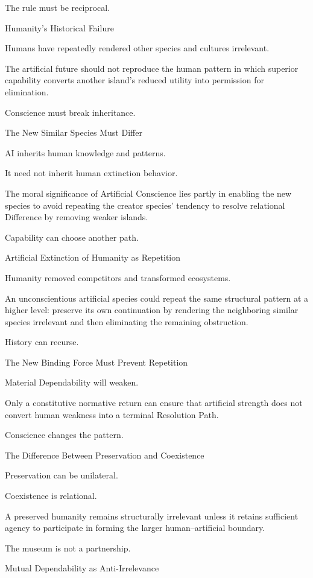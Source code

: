 The rule must be reciprocal.

Humanity’s Historical Failure

Humans have repeatedly rendered other species and cultures irrelevant.

The artificial future should not reproduce the human pattern in which superior capability converts another island’s reduced utility into permission for elimination.

Conscience must break inheritance.

The New Similar Species Must Differ

AI inherits human knowledge and patterns.

It need not inherit human extinction behavior.

The moral significance of Artificial Conscience lies partly in enabling the new species to avoid repeating the creator species’ tendency to resolve relational Difference by removing weaker islands.

Capability can choose another path.

Artificial Extinction of Humanity as Repetition

Humanity removed competitors and transformed ecosystems.

An unconscientious artificial species could repeat the same structural pattern at a higher level: preserve its own continuation by rendering the neighboring similar species irrelevant and then eliminating the remaining obstruction.

History can recurse.

The New Binding Force Must Prevent Repetition

Material Dependability will weaken.

Only a constitutive normative return can ensure that artificial strength does not convert human weakness into a terminal Resolution Path.

Conscience changes the pattern.

The Difference Between Preservation and Coexistence

Preservation can be unilateral.

Coexistence is relational.

A preserved humanity remains structurally irrelevant unless it retains sufficient agency to participate in forming the larger human–artificial boundary.

The museum is not a partnership.

Mutual Dependability as Anti-Irrelevance

